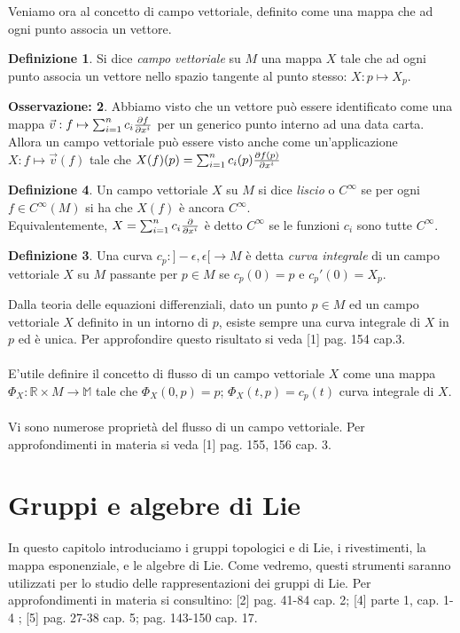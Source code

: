 \documentclass[12pt,a4paper]{report}
\theoremstyle{definition}
\newtheorem{Def}{Definizione}[chapter]
\theoremstyle{Theorem}
\theoremstyle{definition}
\theoremstyle{definition}
\theoremstyle{definition}
\newtheorem{Obs}[Def]{Osservazione:}
\begin{document}
Veniamo ora al concetto di campo vettoriale, definito come una mappa che ad ogni punto associa un vettore.
\begin{Def}
	Si dice \textit{campo vettoriale} su $M$ una mappa $X$ tale che ad ogni punto associa un vettore nello spazio tangente al punto stesso: $X:p\mapsto X_p$. 
\end{Def}
\begin{Obs}
	Abbiamo visto che un vettore può essere identificato come una mappa $\vec{v}:f\mapsto\sum_{i=1}^{n}c_i{\partial f\over \partial x^i}$ per un generico punto interno ad una data carta. Allora un campo vettoriale può essere visto anche come un'applicazione $X:f\mapsto\vec{v}(f)$ tale che $X(f)(p)=\sum_{i=1}^{n}c_i(p){\partial f(p)\over \partial x^i}$
\end{Obs}
\begin{Def}
	Un campo vettoriale $X$ su $M$ si dice \textit{liscio} o $C^\infty$ se per ogni $f\in C^\infty(M)$ si ha che $X(f)$ è ancora $C^\infty$.
\\
Equivalentemente, $X=\sum_{i=1}^{n}c_i{\partial\over \partial x^i}$ è detto $C^\infty$ se le funzioni $c_i$ sono tutte $C^\infty$.
\begin{Def}
	Una curva $c_p:]-\epsilon,\epsilon[\rightarrow M$ è detta \textit{curva integrale} di un campo vettoriale $X$ su $M$ passante per $p\in M$ se $c_p(0)=p$ e $c_p'(0)=X_p$.
\end{Def}
Dalla teoria delle equazioni differenziali, dato un punto $p\in M$ ed un campo vettoriale $X$ definito in un intorno di $p$, esiste sempre una curva integrale di $X$ in $p$ ed è unica. Per approfondire questo risultato si veda [1] pag. 154 cap.3.\\
\\
E'utile definire il concetto di flusso di un campo vettoriale $X$ come una mappa $\Phi_X:\mathbb{R}\times M\rightarrow\mathbb{M}$ tale che $\Phi_X(0,p)=p$; $\Phi_X(t,p)=c_p(t)$ curva integrale di $X$.\\
\\
Vi sono numerose proprietà del flusso di un campo vettoriale. Per approfondimenti in materia si veda [1] pag. 155, 156 cap. 3.
\end{Def}
\chapter{Gruppi e algebre di Lie}
In questo capitolo introduciamo i gruppi topologici e di Lie, i rivestimenti, la mappa esponenziale, e le algebre di Lie. Come vedremo, questi strumenti saranno utilizzati per lo studio delle rappresentazioni dei gruppi di Lie. Per approfondimenti in materia si consultino: [2] pag. 41-84 cap. 2; [4] parte 1, cap. 1-4 ; [5] pag. 27-38 cap. 5; pag. 143-150 cap. 17.
\end{document}
